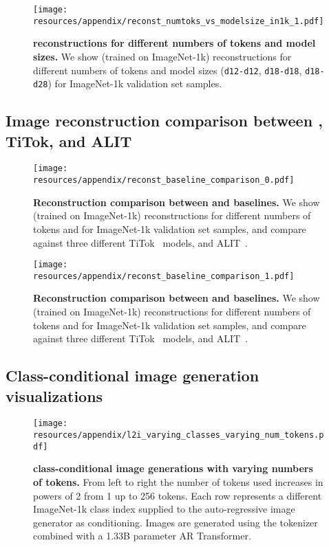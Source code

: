 \begin{figure}[ht!]
\centering
\texttt{[image: resources/appendix/reconst\_numtoks\_vs\_modelsize\_in1k\_1.pdf]}
\caption{
\textbf{\ours reconstructions for different numbers of tokens and model sizes.}
We show \ours (trained on ImageNet-1k) reconstructions for different numbers of tokens and model sizes (\texttt{d12-d12}, \texttt{d18-d18}, \texttt{d18-d28}) for ImageNet-1k validation set samples.
}
\label{fig:app_reconst_vs_model_size_1}
\end{figure}


\clearpage
\subsection{Image reconstruction comparison between \ours, TiTok, and ALIT}
\label{sec:app_reconst_comparison_viz}

\begin{figure}[ht!]
\centering
\texttt{[image: resources/appendix/reconst\_baseline\_comparison\_0.pdf]}
\caption{
\textbf{Reconstruction comparison between \ours and baselines.}
We show \oursxlarge (trained on ImageNet-1k) reconstructions for different numbers of tokens and for ImageNet-1k validation set samples, and compare against three different TiTok~\cite{yu2024titok} models, and ALIT~\cite{Duggal2024ALIT}.
}
\label{fig:app_reconst_comparison_viz_0}
\end{figure}

\begin{figure}[ht!]
\centering
\texttt{[image: resources/appendix/reconst\_baseline\_comparison\_1.pdf]}
\caption{
\textbf{Reconstruction comparison between \ours and baselines.}
We show \oursxlarge (trained on ImageNet-1k) reconstructions for different numbers of tokens and for ImageNet-1k validation set samples, and compare against three different TiTok~\cite{yu2024titok} models, and ALIT~\cite{Duggal2024ALIT}.
}
\label{fig:app_reconst_comparison_viz_1}
\end{figure}


\clearpage
\subsection{Class-conditional image generation visualizations}
\label{sec:app_l2i_viz}

\begin{figure}[ht!]
\centering
\texttt{[image: resources/appendix/l2i\_varying\_classes\_varying\_num\_tokens.pdf]}
\caption{
\textbf{\ours class-conditional image generations with varying numbers of tokens.} From left to right the number of tokens used increases in powers of 2 from 1 up to 256 tokens. Each row represents a different ImageNet-1k class index supplied to the auto-regressive image generator as conditioning. Images are generated using the \oursxlarge tokenizer combined with a 1.33B parameter AR Transformer.
}
\label{fig:l2i_generations_varying_classes_varying_num_tokens}
\end{figure}

